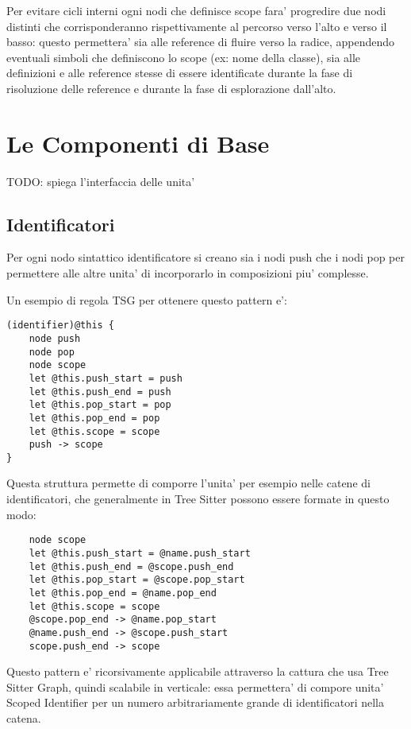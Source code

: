 \par
Per evitare cicli interni ogni nodi che definisce scope fara' progredire due nodi distinti che corrisponderanno rispettivamente al percorso verso l'alto e verso il basso: questo permettera' sia alle reference di fluire verso la radice, appendendo eventuali simboli che definiscono lo scope (ex: nome della classe), sia alle definizioni e alle reference stesse di essere identificate durante la fase di risoluzione delle reference e durante la fase di esplorazione dall'alto.

\section{Le Componenti di Base}

TODO: spiega l'interfaccia delle unita'

\subsection{Identificatori}

Per ogni nodo sintattico identificatore si creano sia i nodi push che i nodi pop per permettere alle altre unita' di incorporarlo in composizioni piu' complesse.


Un esempio di regola TSG per ottenere questo pattern e':

\begin{lstlisting}
(identifier)@this {
    node push
    node pop
    node scope
    let @this.push_start = push
    let @this.push_end = push
    let @this.pop_start = pop
    let @this.pop_end = pop
    let @this.scope = scope
    push -> scope
}
\end{lstlisting}

Questa struttura permette di comporre l'unita' per esempio nelle catene di identificatori, che generalmente in Tree Sitter possono essere formate in questo modo:

\begin{lstlisting}
    node scope
    let @this.push_start = @name.push_start
    let @this.push_end = @scope.push_end
    let @this.pop_start = @scope.pop_start
    let @this.pop_end = @name.pop_end
    let @this.scope = scope
    @scope.pop_end -> @name.pop_start
    @name.push_end -> @scope.push_start
    scope.push_end -> scope
\end{lstlisting}

Questo pattern e' ricorsivamente applicabile attraverso la cattura che usa Tree Sitter Graph, quindi scalabile in verticale: essa permettera' di compore unita' Scoped Identifier per un numero arbitrariamente grande di identificatori nella catena.

